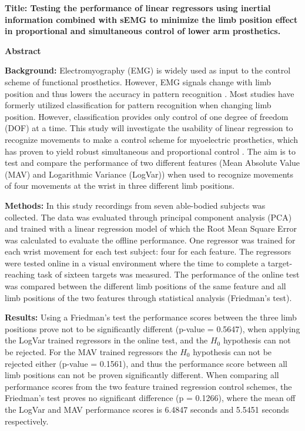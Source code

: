 




	
\textbf{Title: Testing the performance of linear regressors using inertial information combined with sEMG to minimize the limb position effect in proportional and simultaneous control of lower arm prosthetics.}
	
\textbf{Abstract}

\textbf{Background:} Electromyography (EMG) is widely used as input to the control scheme of functional prosthetics. However, EMG signals change with limb position and thus lowers the accuracy in pattern recognition \cite{Fougner2010}.%
Most studies have formerly utilized classification for pattern recognition when changing limb position.  
However, classification provides only control of one degree of freedom (DOF) at a time. This study will investigate the usability of linear regression to recognize movements to make a control scheme for myoelectric prosthetics, which has proven to yield robust simultaneous and proportional control \cite{hahne2014}. The aim is to test and compare the performance of two different features (Mean Absolute Value (MAV) and Logarithmic Variance (LogVar)) when used to recognize movements of four movements at the wrist in three different limb positions.

\textbf{Methods:} In this study recordings from seven able-bodied subjects was collected. The data was evaluated through principal component analysis (PCA) and trained with a linear regression model of which the Root Mean Square Error was calculated to evaluate the offline performance. One regressor was trained for each wrist movement for each test subject: four for each feature. The regressors were tested online in a visual environment where the time to complete a target-reaching task of sixteen targets was measured. The performance of the online test was compared between the different limb positions of the same feature and all limb positions of the two features through statistical analysis (Friedman's test).

\textbf{Results:} 
Using a Friedman's test the performance scores between the three limb positions prove not to be significantly different (p-value = 0.5647), when applying the LogVar trained regressors in the online test, and the $H_0$ hypothesis can not be rejected. For the MAV trained regressors the $H_0$ hypothesis can not be rejected either (p-value = 0.1561), and thus the performance score between all limb positions can not be proven significantly different. When comparing all performance scores from the two feature trained regression control schemes, the Friedman's test proves no significant difference (p = 0.1266), where the mean off the LogVar and MAV performance scores is 6.4847 seconds and 5.5451 seconds respectively.

